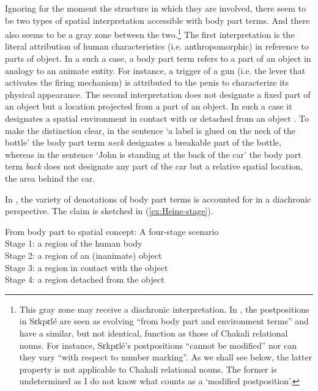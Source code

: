 \begin{exe}
\begin{exe}
\begin{exe}
{\begin{exe}
\begin{exe}
\begin{exe}
\begin{exe}
\begin{exe}
\begin{exe}
\begin{exe}
\begin{table}[h]
\end{table} 

Ignoring for the moment the structure in which they are involved, there seem to
be two types
of spatial interpretation accessible with body part terms. And there also seems
to be a gray zone between the two.\footnote{This gray zone may receive a
diachronic interpretation.  In
\citet[1072]{Amek07c},  the postpositions in Sɛkpɛlé are seen as evolving
``from body part and environment terms''  and have a similar, but not
identical, 
function as those of Chakali relational nouns. For instance, Sɛkpɛlé's  
postpositions ``cannot be modified'' nor can they vary ``with respect to number
 marking''.  As we shall see below, the latter property is not applicable to
Chakali relational nouns. The former is undetermined as I do not know what
counts as a `modified postposition'.} The first interpretation is the literal
attribution of human
characteristics (i.e. anthropomorphic) in  reference to parts of object. In a
such a
case, a body part term refers to a part of an object in analogy to an animate
entity. For instance, a trigger of a gun (i.e. the lever that activates the
firing
mechanism) is  attributed to the penis to characterize its physical appearance.
The
second interpretation does not designate a fixed part of an object
but a location projected from a part of an object.  In such a case it designates
a spatial environment in contact with or detached from an object
\citep[44]{Hein97}. To make the
distinction clear,  in the sentence `a label is glued on the neck of the bottle'
the body part term {\it neck} designates a breakable part of the bottle, whereas
in the sentence `John is standing at the back of the car' the body part term
{\it back} does not designate any part of the car but a relative spatial
location, the area behind the car. 


 In \citet[44]{Hein97}, the variety of denotations of body part terms is
accounted for in a diachronic perspective. The  claim is sketched in
(\ref{ex:Heine-stage}).


\ea\label{ex:Heine-stage}{\rm From body part to spatial concept: A four-stage
scenario \citep[44]{Hein97}}\\
Stage 1: a region of the human body\\
Stage 2: a region of an (inanimate) object\\
Stage 3: a region in contact with the object\\ 
Stage 4:  a region detached from the object\\
\z



\end{exe}
\end{exe}
\end{exe}
\end{exe}
\end{exe}
\end{exe}
\end{exe}}
\end{exe}
\end{exe}
\end{exe}
